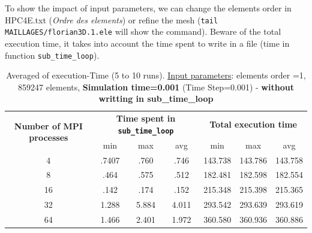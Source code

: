 \documentclass[10pt,twoside]{article}   	%
\begin{document}
To show the impact of input parameters, we can change the elements order in HPC4E.txt (\textit{Ordre des elements}) or refine the mesh (\texttt{tail MAILLAGES/florian3D.1.ele} will show the command). Beware of the total execution time, it takes into account the time spent to write in a file (time in function \texttt{sub\_time\_loop}).

\begin{table}[ht!]
\centering
\caption{Averaged of execution-Time (5 to 10 runs). {\underline{Input parameters}}: elements order =1, 859247 elements, {\bf{Simulation time=0.001}} (Time Step=0.001) - {\bf{without writting in sub\_time\_loop}}}
{\small
\begin{tabular}{|c|c|c|c|c|c|c|} \hline 
\multirow{2}{*}{ {{\bf{Number of MPI processes}}} }	& \multicolumn{3}{c|}{ {{\bf{Time spent in \texttt{sub\_time\_loop}  }}} }	& \multicolumn{3}{c|}{  {{\bf{Total execution time}}} }\\ 
										&  min 	& max	 & avg									& 	min & max & avg			\\ \hline \hline
 		4		                 				&  .7407	& .760 	& .746									&  	143.738 & 143.786	& 143.758 \\ \hline
 		8		                 				& .464	& .575  	& .512									&  	182.481 & 182.598 	& 182.554	\\ \hline		
 		16		                 				&  .142	& .174	 & .152									&  	215.348 & 215.398 	&  215.365\\ \hline
		 32		                 				& 1.288	&  5.884  & 4.011		  						        &  	293.542 &  293.639	& 293.619	\\ \hline
		64		                 				& 1.466	& 2.401 & 1.972									&  	360.580 & 360.936	& 360.886\\ \hline
\end{tabular}
}
\label{tab:1}
\end{table}
\end{document}
